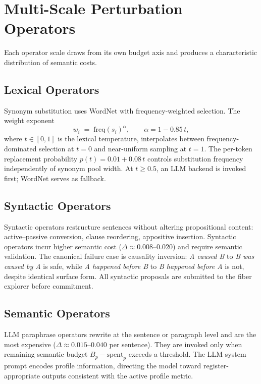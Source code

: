 \documentclass[12pt, a4paper]{article}
\theoremstyle{plain}
\theoremstyle{definition}
\theoremstyle{remark}
\begin{document}
\section{Multi-Scale Perturbation Operators}
\label{sec:operators}

Each operator scale draws from its own budget axis and produces a characteristic
distribution of semantic costs.

\subsection{Lexical Operators}

Synonym substitution uses WordNet \cite{miller1995wordnet} with
frequency-weighted selection.  The weight exponent
\[
   w_i \;=\; \mathrm{freq}(s_i)^{\alpha}, \qquad \alpha = 1 - 0.85\,t,
\]
where $t \in [0,1]$ is the lexical temperature, interpolates between
frequency-dominated selection at $t = 0$ and near-uniform sampling at $t = 1$.
The per-token replacement probability $p(t) = 0.01 + 0.08\,t$ controls
substitution frequency independently of synonym pool width.  At
$t \ge 0.5$, an LLM backend is invoked first; WordNet serves as fallback.

\subsection{Syntactic Operators}

Syntactic operators restructure sentences without altering propositional content:
active--passive conversion, clause reordering, appositive insertion.  Syntactic
operators incur higher semantic cost ($\Delta \approx 0.008$--$0.020$) and
require semantic validation.  The canonical failure case is causality inversion:
\emph{A caused B} to \emph{B was caused by A} is safe, while
\emph{A happened before B} to \emph{B happened before A} is not, despite
identical surface form.  All syntactic proposals are submitted to the fiber
explorer before commitment.

\subsection{Semantic Operators}

LLM paraphrase operators rewrite at the sentence or paragraph level and are the
most expensive ($\Delta \approx 0.015$--$0.040$ per sentence).  They are invoked
only when remaining semantic budget $B_p - \mathrm{spent}_p$ exceeds a
threshold.  The LLM system prompt encodes profile information, directing the
model toward register-appropriate outputs consistent with the active profile
metric.
\end{document}
